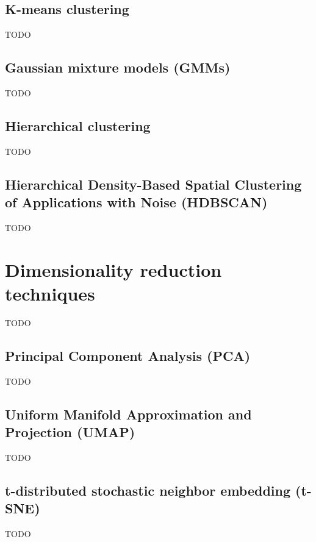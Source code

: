 \subsection{K-means clustering}
TODO

\subsection{Gaussian mixture models (GMMs)}
TODO

\subsection{Hierarchical clustering}
TODO

\subsection{Hierarchical Density-Based Spatial Clustering of Applications with Noise (HDBSCAN)}
TODO

\section{Dimensionality reduction techniques}
TODO

\subsection{Principal Component Analysis (PCA)}
TODO

\subsection{Uniform Manifold Approximation and Projection (UMAP)}
TODO

\subsection{t-distributed stochastic neighbor embedding (t-SNE)}
TODO